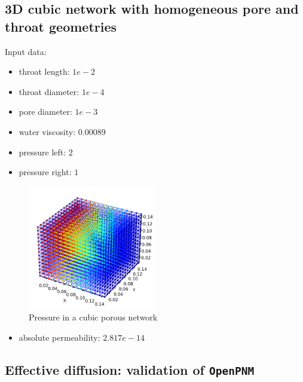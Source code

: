 \documentclass{article}
\begin{document}
\subsection{3D cubic network with homogeneous pore and throat geometries}
Input data:
\begin{itemize}
    \item throat length: $1e-2$
    \item throat diameter: $1e-4$
    \item pore diameter: $1e-3$
    \item water viscosity: $0.00089$
    \item pressure left: $2$
    \item pressure right: $1$
\end{itemize}
\begin{figure}[htbp]
    \centering
    \includegraphics[width=0.5\textwidth]{images/3DcubicPoreNet.png}
    \caption{Pressure in a cubic porous network}
    \label{fig:3DcubicPN}
\end{figure}
\begin{itemize}
    \item absolute permeability: $2.817e-14$
\end{itemize}

\FloatBarrier  %
\subsection{Effective diffusion: validation of \texttt{OpenPNM}}
\end{document}
